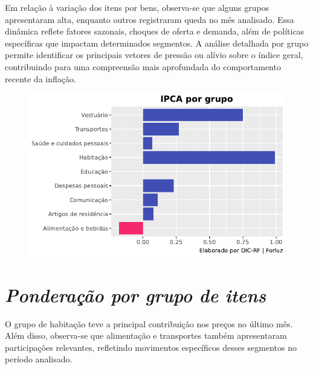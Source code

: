 \documentclass[
  letterpaper,
  DIV=11,
  numbers=noendperiod]{scrartcl}
\begin{document}
Em relação à variação dos itens por bens, observa-se que alguns grupos
apresentaram alta, enquanto outros registraram queda no mês analisado.
Essa dinâmica reflete fatores sazonais, choques de oferta e demanda,
além de políticas específicas que impactam determinados segmentos. A
análise detalhada por grupo permite identificar os principais vetores de
pressão ou alívio sobre o índice geral, contribuindo para uma
compreensão mais aprofundada do comportamento recente da inflação.

\begin{figure}

{\centering \includegraphics{IPCAForluz_files/figure-pdf/cell-6-output-1.pdf}

}

\end{figure}

\hypertarget{ponderauxe7uxe3o-por-grupo-de-itens}{%
\section{\texorpdfstring{\emph{Ponderação por grupo de
itens}}{Ponderação por grupo de itens}}\label{ponderauxe7uxe3o-por-grupo-de-itens}}

O grupo de habitação teve a principal contribuição nos preços no último
mês. Além disso, observa-se que alimentação e transportes também
apresentaram participações relevantes, refletindo movimentos específicos
desses segmentos no período analisado.
\end{document}
